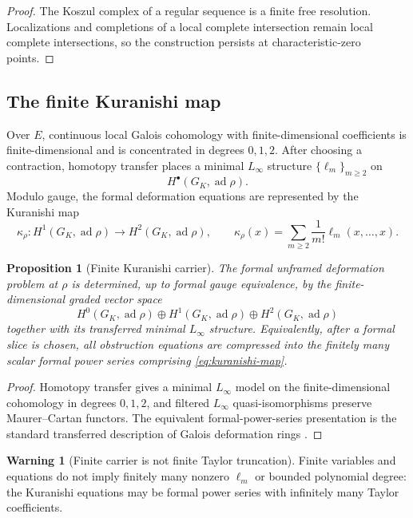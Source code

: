 \documentclass[11pt]{article}
\newtheorem{proposition}[theorem]{Proposition}
\theoremstyle{definition}
\newtheorem{warning}[theorem]{Warning}
\begin{document}
\begin{proof}
The Koszul complex of a regular sequence is a finite free resolution.  Localizations and completions of a local complete intersection remain local complete intersections, so the construction persists at characteristic-zero points.
\end{proof}

\subsection{The finite Kuranishi map}

Over $E$, continuous local Galois cohomology with finite-dimensional coefficients is finite-dimensional and is concentrated in degrees $0,1,2$.  After choosing a contraction, homotopy transfer places a minimal $L_\infty$ structure $\{\ell_m\}_{m\ge2}$ on
\[
H^\bullet(G_K,\operatorname{ad}\rho).
\]
Modulo gauge, the formal deformation equations are represented by the Kuranishi map
\begin{equation}\label{eq:kuranishi-map}
\kappa_\rho:H^1(G_K,\operatorname{ad}\rho)
\longrightarrow
H^2(G_K,\operatorname{ad}\rho),
\qquad
\kappa_\rho(x)=\sum_{m\ge2}\frac{1}{m!}\ell_m(x,\ldots,x).
\end{equation}

\begin{proposition}[Finite Kuranishi carrier]\label{prop:finite-kuranishi}
The formal unframed deformation problem at $\rho$ is determined, up to formal gauge equivalence, by the finite-dimensional graded vector space
\[
H^0(G_K,\operatorname{ad}\rho)\oplus
H^1(G_K,\operatorname{ad}\rho)\oplus
H^2(G_K,\operatorname{ad}\rho)
\]
together with its transferred minimal $L_\infty$ structure.  Equivalently, after a formal slice is chosen, all obstruction equations are compressed into the finitely many scalar formal power series comprising \eqref{eq:kuranishi-map}.
\end{proposition}

\begin{proof}
Homotopy transfer gives a minimal $L_\infty$ model on the finite-dimensional cohomology in degrees $0,1,2$, and filtered $L_\infty$ quasi-isomorphisms preserve Maurer--Cartan functors.  The equivalent formal-power-series presentation is the standard transferred description of Galois deformation rings \cite{WangErickson}.
\end{proof}

\begin{warning}[Finite carrier is not finite Taylor truncation]\label{warn:lci-not-formal}
Finite variables and equations do not imply finitely many nonzero $\ell_m$ or bounded polynomial degree: the Kuranishi equations may be formal power series with infinitely many Taylor coefficients.
\end{warning}
\end{document}
